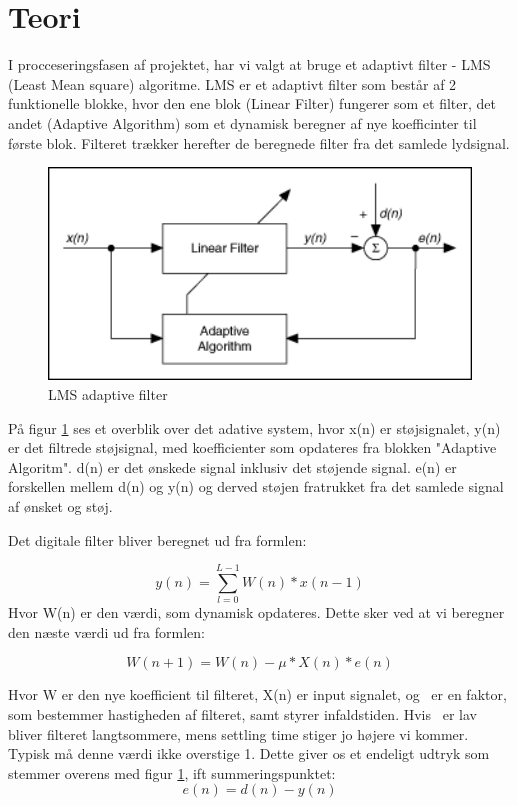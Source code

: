 \graphicspath{{Chapters/Indledning/}}


\section{Teori}
I procceseringsfasen af projektet, har vi valgt at bruge et adaptivt filter - LMS (Least Mean square) algoritme. LMS er et adaptivt filter som består af 2 funktionelle blokke, hvor den ene blok (Linear Filter) fungerer som et filter, det andet (Adaptive Algorithm) som et dynamisk beregner af nye koefficinter til første blok.  Filteret trækker herefter de beregnede filter fra det samlede lydsignal. 
   

\begin{figure}[H]
	\centering
	\includegraphics[width = 400pt]{Img/Figures}
	\caption{LMS adaptive filter}
	\label{fig:LMS_filter}
\end{figure}

På figur \ref{fig:LMS_filter} ses et overblik over det adative system, hvor x(n) er støjsignalet, y(n) er det filtrede støjsignal, med koefficienter som opdateres fra blokken "Adaptive Algoritm". d(n) er det ønskede signal inklusiv det støjende signal. e(n) er forskellen mellem d(n) og y(n) og derved støjen fratrukket fra det samlede signal af ønsket og støj.\cite{Teori}  \newline 


Det digitale filter bliver beregnet ud fra formlen:

\begin{equation}
  y(n) = \displaystyle\sum_{l=0}^{L-1} W(n)*x(n-1)
\end{equation}
Hvor W(n) er den værdi, som dynamisk opdateres. Dette sker ved at vi beregner den næste værdi ud fra formlen: 

\begin{equation}
  W(n+1) = W(n)-\mu *X(n)*e(n)
\end{equation}

Hvor W er den nye koefficient til filteret, X(n) er input signalet, og \textmu\ er en faktor, som bestemmer hastigheden af filteret, samt styrer infaldstiden. Hvis \textmu\ er lav bliver filteret langtsommere, mens settling time stiger jo højere vi kommer. Typisk må denne værdi ikke overstige 1. 
\newline
Dette giver os et endeligt udtryk som stemmer overens med figur \ref{fig:LMS_filter}, ift summeringspunktet: 
\begin{equation}
  e(n) = d(n)-y(n)
\end{equation} 
